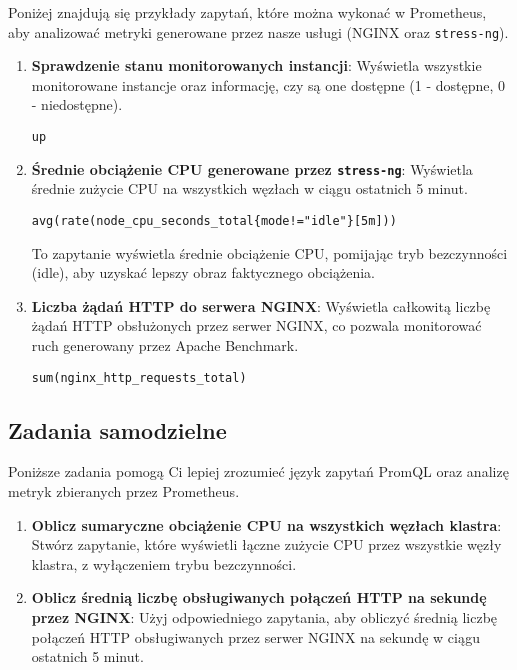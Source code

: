 \documentclass{article}
\begin{document}
Poniżej znajdują się przykłady zapytań, które można wykonać w Prometheus, aby analizować metryki generowane przez nasze usługi (NGINX oraz \texttt{stress-ng}).
\begin{enumerate}
  \item \textbf{Sprawdzenie stanu monitorowanych instancji}: Wyświetla wszystkie monitorowane instancje oraz informację, czy są one dostępne (1 - dostępne, 0 - niedostępne).
\begin{lstlisting}
up
\end{lstlisting}

\item \textbf{Średnie obciążenie CPU generowane przez \texttt{stress-ng}}: Wyświetla średnie zużycie CPU na wszystkich węzłach w ciągu ostatnich 5 minut.
\begin{lstlisting}
avg(rate(node_cpu_seconds_total{mode!="idle"}[5m]))
\end{lstlisting}
To zapytanie wyświetla średnie obciążenie CPU, pomijając tryb bezczynności (idle), aby uzyskać lepszy obraz faktycznego obciążenia.

\item \textbf{Liczba żądań HTTP do serwera NGINX}: Wyświetla całkowitą liczbę żądań HTTP obsłużonych przez serwer NGINX, co pozwala monitorować ruch generowany przez Apache Benchmark.
\begin{lstlisting}
sum(nginx_http_requests_total)
\end{lstlisting}

\end{enumerate}

\subsection{Zadania samodzielne}

Poniższe zadania pomogą Ci lepiej zrozumieć język zapytań PromQL oraz analizę metryk zbieranych przez Prometheus.

\begin{enumerate}
    \item \textbf{Oblicz sumaryczne obciążenie CPU na wszystkich węzłach klastra}: Stwórz zapytanie, które wyświetli łączne zużycie CPU przez wszystkie węzły klastra, z wyłączeniem trybu bezczynności.

    \item \textbf{Oblicz średnią liczbę obsługiwanych połączeń HTTP na sekundę przez NGINX}: Użyj odpowiedniego zapytania, aby obliczyć średnią liczbę połączeń HTTP obsługiwanych przez serwer NGINX na sekundę w ciągu ostatnich 5 minut.

\end{enumerate}
\end{document}
